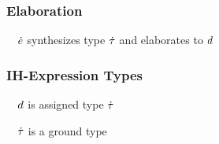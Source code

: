 \documentclass[12pt]{article}
\begin{document}
\subsubsection{Elaboration}
        {~~$\HExpVar$ synthesizes type $\HTypVar$ and elaborates to $\IHExpVar$}
%
\begin{mathpar}

\end{mathpar}

\subsubsection{IH-Expression Types}
        {~~$\IHExpVar$ is assigned type $\HTypVar$}
%
\begin{mathpar}

\end{mathpar}

\judgbox{\isGround{\HTypVar}}
        {~~$\HTypVar$ is a ground type}
%
\begin{mathpar}
\end{mathpar}
\end{document}
